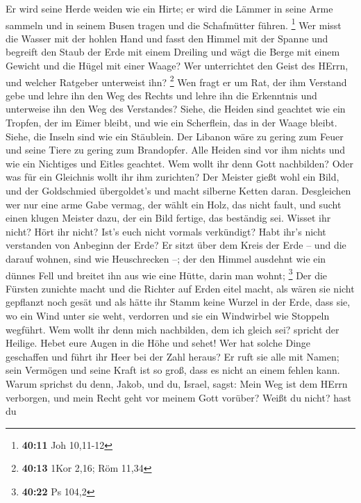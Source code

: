  Er wird seine Herde weiden wie ein Hirte; er wird die
Lämmer in seine Arme sammeln und in seinem Busen tragen und die
Schafmütter führen. \footnote{\textbf{40:11} Joh 10,11-12} 
Wer misst die Wasser mit der hohlen Hand und fasst den Himmel mit der
Spanne und begreift den Staub der Erde mit einem Dreiling und wägt die
Berge mit einem Gewicht und die Hügel mit einer Waage?  Wer
unterrichtet den Geist des HErrn, und welcher Ratgeber unterweist ihn?
\footnote{\textbf{40:13} 1Kor 2,16; Röm 11,34}  Wen fragt
er um Rat, der ihm Verstand gebe und lehre ihn den Weg des Rechts und
lehre ihn die Erkenntnis und unterweise ihn den Weg des Verstandes?
 Siehe, die Heiden sind geachtet wie ein Tropfen, der im
Eimer bleibt, und wie ein Scherflein, das in der Waage bleibt. Siehe,
die Inseln sind wie ein Stäublein.  Der Libanon wäre zu
gering zum Feuer und seine Tiere zu gering zum Brandopfer. 
Alle Heiden sind vor ihm nichts und wie ein Nichtiges und Eitles
geachtet.  Wem wollt ihr denn Gott nachbilden? Oder was für
ein Gleichnis wollt ihr ihm zurichten?  Der Meister gießt
wohl ein Bild, und der Goldschmied übergoldet's und macht silberne
Ketten daran.  Desgleichen wer nur eine arme Gabe vermag,
der wählt ein Holz, das nicht fault, und sucht einen klugen Meister
dazu, der ein Bild fertige, das beständig sei.  Wisset ihr
nicht? Hört ihr nicht? Ist's euch nicht vormals verkündigt? Habt ihr's
nicht verstanden von Anbeginn der Erde?  Er sitzt über dem
Kreis der Erde -- und die darauf wohnen, sind wie Heuschrecken --; der
den Himmel ausdehnt wie ein dünnes Fell und breitet ihn aus wie eine
Hütte, darin man wohnt; \footnote{\textbf{40:22} Ps 104,2} 
Der die Fürsten zunichte macht und die Richter auf Erden eitel macht,
 als wären sie nicht gepflanzt noch gesät und als hätte ihr
Stamm keine Wurzel in der Erde, dass sie, wo ein Wind unter sie weht,
verdorren und sie ein Windwirbel wie Stoppeln wegführt. 
Wem wollt ihr denn mich nachbilden, dem ich gleich sei? spricht der
Heilige.  Hebet eure Augen in die Höhe und sehet! Wer hat
solche Dinge geschaffen und führt ihr Heer bei der Zahl heraus? Er ruft
sie alle mit Namen; sein Vermögen und seine Kraft ist so groß, dass es
nicht an einem fehlen kann.  Warum sprichst du denn, Jakob,
und du, Israel, sagst: Mein Weg ist dem HErrn verborgen, und mein Recht
geht vor meinem Gott vorüber?  Weißt du nicht? hast du
